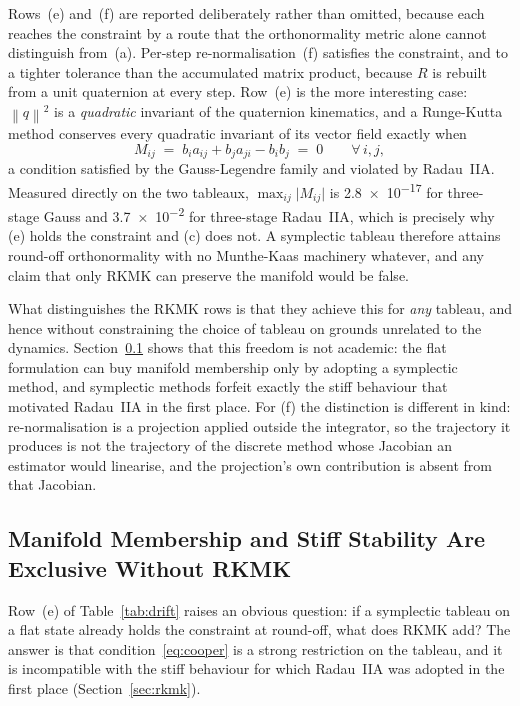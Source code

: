 \documentclass[a4paper,10pt]{article}
\newcommand{\norm}[1]{\left\lVert #1 \right\rVert}
\theoremstyle{definition}
\begin{document}
Rows~(e) and~(f) are reported deliberately rather than omitted, because each
reaches the constraint by a route that the orthonormality metric alone cannot
distinguish from~(a).  Per-step re-normalisation~(f) satisfies the constraint,
and to a tighter tolerance than the accumulated matrix product, because $R$ is
rebuilt from a unit quaternion at every step.  Row~(e) is the more interesting
case: $\norm{q}^2$ is a \emph{quadratic} invariant of the quaternion kinematics,
and a Runge-Kutta method conserves every quadratic invariant of its vector
field exactly when
\begin{equation}
  M_{ij} \;=\; b_i a_{ij} + b_j a_{ji} - b_i b_j \;=\; 0
  \qquad \forall\, i,j ,
  \label{eq:cooper}
\end{equation}
a condition satisfied by the Gauss-Legendre family and violated by Radau~IIA.
Measured directly on the two tableaux, $\max_{ij}\lvert M_{ij}\rvert$ is
\num{2.8e-17} for three-stage Gauss and \num{3.7e-2} for three-stage
Radau~IIA, which is precisely why (e) holds the constraint and (c) does not.  A
symplectic tableau therefore attains round-off orthonormality with no
Munthe-Kaas machinery whatever, and any claim that only RKMK can preserve the
manifold would be false.

What distinguishes the RKMK rows is that they achieve this for \emph{any}
tableau, and hence without constraining the choice of tableau on grounds
unrelated to the dynamics.  Section~\ref{sec:stiff_exclusive} shows that this
freedom is not academic: the flat formulation can buy manifold membership only
by adopting a symplectic method, and symplectic methods forfeit exactly the
stiff behaviour that motivated Radau~IIA in the first place.  For (f) the
distinction is different in kind: re-normalisation is a projection applied
outside the integrator, so the trajectory it produces is not the trajectory of
the discrete method whose Jacobian an estimator would linearise, and the
projection's own contribution is absent from that Jacobian.

\subsection{Manifold Membership and Stiff Stability Are Exclusive Without RKMK}
\label{sec:stiff_exclusive}

Row~(e) of Table~\ref{tab:drift} raises an obvious question: if a symplectic
tableau on a flat state already holds the constraint at round-off, what does
RKMK add?  The answer is that condition~\eqref{eq:cooper} is a strong
restriction on the tableau, and it is incompatible with the stiff behaviour for
which Radau~IIA was adopted in the first place (Section~\ref{sec:rkmk}).
\end{document}
